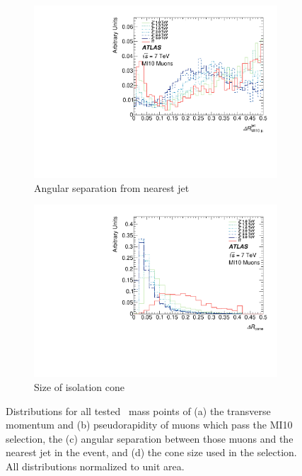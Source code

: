 \begin{figure}[htbp]
  \begin{subfigure}{0.48\textwidth}
    \includegraphics[width=\textwidth]{PartBoosted/Plots/h_mi10_jet_dr.pdf}
    \caption{Angular separation from nearest jet} \label{fig:BoostedControlMI10Dr}
  \end{subfigure}
  \begin{subfigure}{0.48\textwidth}
    \includegraphics[width=\textwidth]{PartBoosted/Plots/h_mi10_coneSize.pdf}
    \caption{Size of isolation cone} \label{fig:BoostedControlMI10Cone}
  \end{subfigure}

  \caption{Distributions for all tested \Zprime\ mass points of (a) the transverse momentum and (b) pseudorapidity of muons which pass the MI10 selection, the (c) angular separation between those muons and the nearest jet in the event, and (d) the cone size used in the selection. All distributions normalized to unit area.} \label{fig:BoostedControlMI10}
\end{figure}

